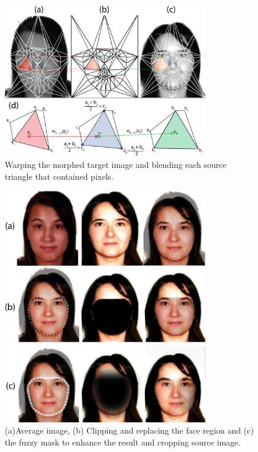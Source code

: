 \begin{figure}[ht]
     \centering
     \includegraphics[width=0.8\textwidth]{ch-sistemasABC/images/ch-morphing/TriangulacionFusion_CristinaBea_COMPACTA.png}
     \caption{Warping the morphed target image and blending each source triangle that contained pixels.}
     \label{fig:Triangulación}
\end{figure}

\begin{figure}[ht]
     \centering
     \includegraphics[width=0.8\textwidth]{ch-sistemasABC/images/ch-morphing/MorphingEnhanceMask_COMPACTA.png}
     \caption{(a)Average image, (b) Clipping and replacing the  face region and (c) the fuzzy mask to enhance the result and cropping source image.}
     \label{fig:Enhancement}
\end{figure}

